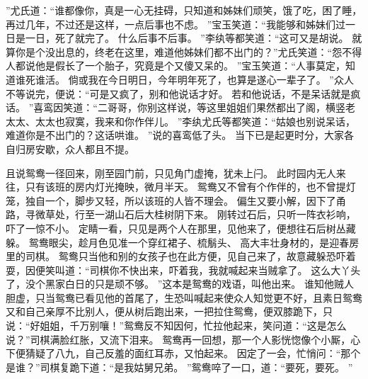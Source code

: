 ”尤氏道：“谁都像你，真是一心无挂碍，只知道和姊妹们顽笑，饿了吃，困了睡，再过几年，不过还是这样，一点后事也不虑。
”宝玉笑道：“我能够和姊妹们过一日是一日，死了就完了。
什么后事不后事。
”李纨等都笑道：“这可又是胡说。
就算你是个没出息的，终老在这里，难道他姊妹们都不出门的？”尤氏笑道：“怨不得人都说他是假长了一个胎子，究竟是个又傻又呆的。
”宝玉笑道：“人事莫定，知道谁死谁活。
倘或我在今日明日，今年明年死了，也算是遂心一辈子了。
”众人不等说完，便说：“可是又疯了，别和他说话才好。
若和他说话，不是呆话就是疯话。
”喜鸾因笑道：“二哥哥，你别这样说，等这里姐姐们果然都出了阁，横竖老太太、太太也寂寞，我来和你作伴儿。
”李纨尤氏等都笑道：“姑娘也别说呆话，难道你是不出门的？这话哄谁。
”说的喜鸾低了头。
当下已是起更时分，大家各自归房安歇，众人都且不提。
\par
且说鸳鸯一径回来，刚至园门前，只见角门虚掩，犹未上闩。
此时园内无人来往，只有该班的房内灯光掩映，微月半天。
鸳鸯又不曾有个作伴的，也不曾提灯笼，独自一个，脚步又轻，所以该班的人皆不理会。
偏生又要小解，因下了甬路，寻微草处，行至一湖山石后大桂树阴下来。
刚转过石后，只听一阵衣衫响，吓了一惊不小。
定睛一看，只见是两个人在那里，见他来了，便想往石后树丛藏躲。
鸳鸯眼尖，趁月色见准一个穿红裙子、梳鬅头、
高大丰壮身材的，是迎春房里的司棋。
鸳鸯只当他和别的女孩子也在此方便，见自己来了，故意藏躲恐吓着耍，因便笑叫道：“司棋你不快出来，吓着我，我就喊起来当贼拿了。
这么大丫头了，没个黑家白日的只是顽不够。
”这本是鸳鸯的戏语，叫他出来。
谁知他贼人胆虚，只当鸳鸯已看见他的首尾了，生恐叫喊起来使众人知觉更不好，且素日鸳鸯又和自己亲厚不比别人，便从树后跑出来，一把拉住鸳鸯，便双膝跪下，只说：“好姐姐，千万别嚷！”鸳鸯反不知因何，忙拉他起来，笑问道：“这是怎么说？”司棋满脸红胀，又流下泪来。
鸳鸯再一回想，那一个人影恍惚像个小厮，心下便猜疑了八九，自己反羞的面红耳赤，又怕起来。
因定了一会，忙悄问：“那个是谁？”司棋复跪下道：“是我姑舅兄弟。
”鸳鸯啐了一口，道：“要死，要死。
”
